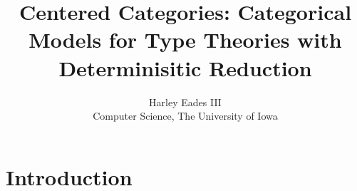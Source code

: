 \documentclass{article}
\begin{document}
\title{Centered Categories: Categorical Models for Type Theories with Determinisitic Reduction}

\author{Harley Eades III \\
Computer Science, The University of Iowa}

\date{}

\maketitle

\newcommand{\imp}[1]{\stackrel{#1}{\to}}
\newcommand{\orbox}[2]{#1 \vee #2}

\section{Introduction}
\label{sec:introduction}
\end{document}
